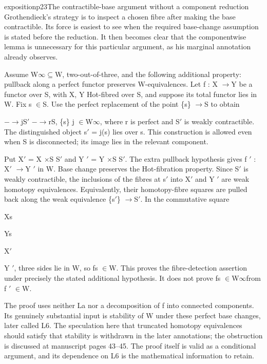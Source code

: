 \begin{dcomment}{exposition}{p23}{The contractible-base argument without a component reduction}
Grothendieck’s strategy is to inspect a chosen fibre after making the base contractible. Its force is easiest to see when the required base-change assumption is stated before the reduction. It then becomes clear that the componentwise lemma is unnecessary for this particular argument, as his marginal annotation already observes.

Assume W\ensuremath{\infty}\ensuremath{\subseteq}W, two-out-of-three, and the following additional property: pullback along a perfect functor preserves W-equivalences. Let f : X \ensuremath{\to}Y be a functor over S, with X, Y Hot-fibred over S, and suppose its total functor lies in W. Fix s \ensuremath{\in}S. Use the perfect replacement of the point \{s\} \ensuremath{\to}S to obtain

\ensuremath{-}\ensuremath{\to}jS\ensuremath{\prime} \ensuremath{-}\ensuremath{\to}rS, \{s\} j \ensuremath{\in}W\ensuremath{\infty}, where r is perfect and S\ensuremath{\prime} is weakly contractible. The distinguished object s\ensuremath{\prime} = j(s) lies over s. This construction is allowed even when S is disconnected; its image lies in the relevant component.

Put X\ensuremath{\prime} = X \ensuremath{\times}S S\ensuremath{\prime} and Y \ensuremath{\prime} = Y \ensuremath{\times}S S\ensuremath{\prime}. The extra pullback hypothesis gives f \ensuremath{\prime} : X\ensuremath{\prime} \ensuremath{\to}Y \ensuremath{\prime} in W. Base change preserves the Hot-fibration property. Since S\ensuremath{\prime} is weakly contractible, the inclusions of the fibres at s\ensuremath{\prime} into X\ensuremath{\prime} and Y \ensuremath{\prime} are weak homotopy equivalences. Equivalently, their homotopy-fibre squares are pulled back along the weak equivalence \{s\ensuremath{\prime}\} \ensuremath{\to}S\ensuremath{\prime}. In the commutative square

Xs

Ys

X\ensuremath{\prime}

Y \ensuremath{\prime}, three sides lie in W, so fs \ensuremath{\in}W. This proves the fibre-detection assertion under precisely the stated additional hypothesis. It does not prove fs \ensuremath{\in}W\ensuremath{\infty}from f \ensuremath{\prime} \ensuremath{\in}W.

The proof uses neither La nor a decomposition of f into connected components. Its genuinely substantial input is stability of W under these perfect base changes, later called L6. The speculation here that truncated homotopy equivalences should satisfy that stability is withdrawn in the later annotations; the obstruction is discussed at manuscript pages 43--45. The proof itself is valid as a conditional argument, and its dependence on L6 is the mathematical information to retain.

\end{dcomment}


